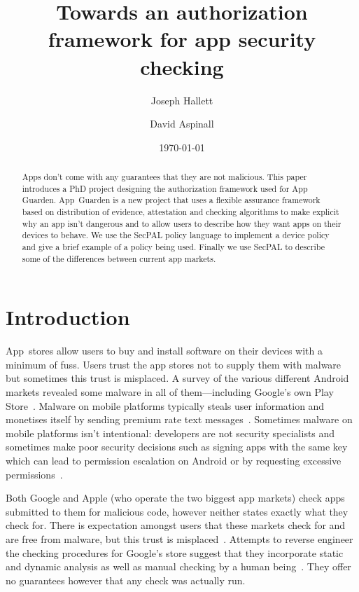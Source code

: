 \documentclass[]{llncs}
\title{Towards an authorization framework for app security checking}
\author{Joseph Hallett
  \and David Aspinall
}
\institute{University of Edinburgh}
\date{\today}
\begin{document}
\maketitle

\begin{abstract} 
  
  Apps don't come with any guarantees that they are not malicious.  This paper
  introduces a PhD project designing the authorization framework used for App
  Guarden. App~Guarden is a new project that uses a flexible assurance
  framework based on distribution of evidence, attestation and checking
  algorithms to make explicit why an app isn't dangerous and to allow users to
  describe how they want apps on their devices to behave.  We use the SecPAL
  policy language to implement a device policy and give a brief example of a
  policy being used. Finally we use SecPAL to describe some of the differences
  between current app markets. 

\end{abstract}

\section{Introduction}

App~stores allow users to buy and install software on their devices with a
minimum of fuss.  Users trust the app stores not to supply them with malware
but sometimes this trust is misplaced. A survey of the various different
Android markets revealed some malware in all of them---including Google's own
Play Store~\cite{Zhou:2012tb}.  Malware on mobile platforms typically steals
user information and monetises itself by sending premium rate text
messages~\cite{Felt:2011we}.  
Sometimes malware on mobile platforms isn't intentional: developers are not
security specialists and sometimes make poor security decisions such as signing
apps with the same key~\cite{Barrera:2012ib} which can lead to permission
escalation on Android or by requesting excessive
permissions~\cite{Felt:2011kj}.

Both Google and Apple (who operate the two biggest app markets) check apps
submitted to them for malicious code, however neither states exactly what they
check for. There is expectation amongst users that these markets check for and
are free from malware, but this trust is misplaced~\cite{Enck:2010ta}. Attempts
to reverse engineer the checking procedures for Google's store suggest that
they incorporate static and dynamic analysis as well as manual checking by a
human being~\cite{Oberheide:2012tl}. They offer no guarantees however that any
check was actually run.
\end{document}
